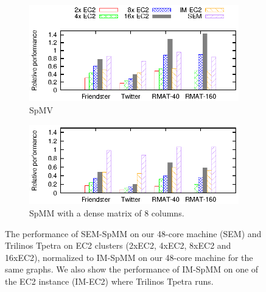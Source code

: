 \begin{figure}
	\footnotesize
	\centering
	\begin{subfigure}[b]{0.5\textwidth}
		\centering
		\includegraphics[scale=1]{SpMM_figs/SpMV-EC2.eps}
		\vspace{-5pt}
		\caption{SpMV}
		\label{perf:ec2:spmv}
	\end{subfigure}
	\begin{subfigure}[b]{0.5\textwidth}
		\centering
		\includegraphics[scale=1]{SpMM_figs/SpMM-EC2.eps}
		\vspace{-5pt}
		\caption{SpMM with a dense matrix of 8 columns.}
		\label{perf:ec2:spmm8}
	\end{subfigure}
	\vspace{3pt}
	\caption{The performance of SEM-SpMM on our 48-core machine (SEM) and
		Trilinos Tpetra on EC2 clusters (2xEC2, 4xEC2, 8xEC2 and 16xEC2),
		normalized to IM-SpMM on our 48-core machine for the same graphs.
		We also show the performance of IM-SpMM on
	one of the EC2 instance (IM-EC2) where Trilinos Tpetra runs.}
	\label{perf:ec2}
\end{figure}

